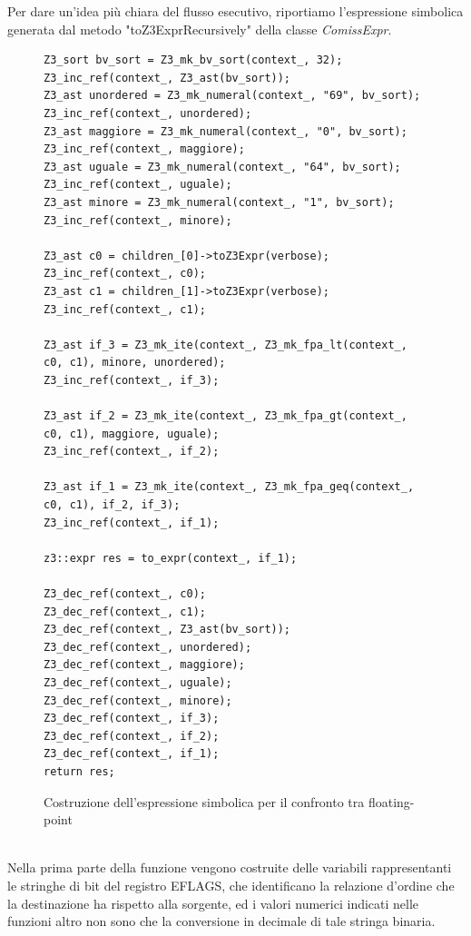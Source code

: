 \documentclass[Lau, oneside]{sapthesis}%
\begin{document}
\newpage
Per dare un'idea più chiara del flusso esecutivo, riportiamo l'espressione simbolica generata dal metodo "toZ3ExprRecursively" della classe \textit{ComissExpr}.
\begin{figure}[h]
\begin{lstlisting}[xleftmargin=0\textwidth, language=SymQEMU, basicstyle=\footnotesize]
Z3_sort bv_sort = Z3_mk_bv_sort(context_, 32);
Z3_inc_ref(context_, Z3_ast(bv_sort));
Z3_ast unordered = Z3_mk_numeral(context_, "69", bv_sort); 
Z3_inc_ref(context_, unordered);
Z3_ast maggiore = Z3_mk_numeral(context_, "0", bv_sort);
Z3_inc_ref(context_, maggiore);
Z3_ast uguale = Z3_mk_numeral(context_, "64", bv_sort);
Z3_inc_ref(context_, uguale);
Z3_ast minore = Z3_mk_numeral(context_, "1", bv_sort); 
Z3_inc_ref(context_, minore);

Z3_ast c0 = children_[0]->toZ3Expr(verbose);
Z3_inc_ref(context_, c0);
Z3_ast c1 = children_[1]->toZ3Expr(verbose);
Z3_inc_ref(context_, c1);

Z3_ast if_3 = Z3_mk_ite(context_, Z3_mk_fpa_lt(context_, c0, c1), minore, unordered);    
Z3_inc_ref(context_, if_3);

Z3_ast if_2 = Z3_mk_ite(context_, Z3_mk_fpa_gt(context_, c0, c1), maggiore, uguale);
Z3_inc_ref(context_, if_2);

Z3_ast if_1 = Z3_mk_ite(context_, Z3_mk_fpa_geq(context_, c0, c1), if_2, if_3);
Z3_inc_ref(context_, if_1);
    
z3::expr res = to_expr(context_, if_1);
    
Z3_dec_ref(context_, c0);
Z3_dec_ref(context_, c1);
Z3_dec_ref(context_, Z3_ast(bv_sort));
Z3_dec_ref(context_, unordered);
Z3_dec_ref(context_, maggiore);
Z3_dec_ref(context_, uguale);
Z3_dec_ref(context_, minore);
Z3_dec_ref(context_, if_3);
Z3_dec_ref(context_, if_2);
Z3_dec_ref(context_, if_1);
return res;
\end{lstlisting}
    \caption{Costruzione dell'espressione simbolica per il confronto tra floating-point}
    \label{fig:ComissExpr}
\end{figure}
\ \\ \newline
Nella prima parte della funzione vengono costruite delle variabili rappresentanti le stringhe di bit del registro EFLAGS, che identificano la relazione d'ordine che la destinazione ha rispetto alla sorgente, ed i valori numerici indicati nelle funzioni altro non sono che la conversione in decimale di tale stringa binaria.
\end{document}
